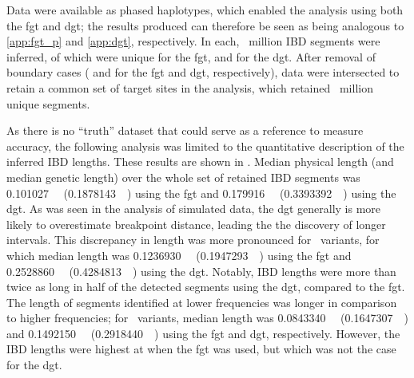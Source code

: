 %

%

Data were available as phased haplotypes, which enabled the analysis using both the \gls{fgt} and \gls{dgt}; \ie the results produced can therefore be seen as being analogous to \cref{app:fgt_p} and \cref{app:dgt}, respectively.
In each, ~million IBD segments were inferred, of which  were unique for the \gls{fgt}, and  for the \gls{dgt}.
After removal of boundary cases ( and  for the \gls{fgt} and \gls{dgt}, respectively), data were intersected to retain a common set of target sites in the analysis, which retained ~million unique segments.

%

%

As there is no ``truth'' dataset that could serve as a reference to measure accuracy, the following analysis was limited to the quantitative description of the inferred IBD lengths.
These results are shown in .
Median physical length (and median genetic length) over the whole set of retained IBD segments was
\SI{0.101027}{\mega\basepair} (\SI{0.1878143}{\centi\morgan}) using the \gls{fgt} and
\SI{0.179916}{\mega\basepair} (\SI{0.3393392}{\centi\morgan}) using the \gls{dgt}.
As was seen in the analysis of simulated data, the \gls{dgt} generally is more likely to overestimate breakpoint distance, leading the the discovery of longer intervals.
This discrepancy in length was more pronounced for ~variants, for which median length was
\SI{0.1236930}{\mega\basepair} (\SI{0.1947293}{\centi\morgan}) using the \gls{fgt} and
\SI{0.2528860}{\mega\basepair} (\SI{0.4284813}{\centi\morgan}) using the \gls{dgt}.
Notably, IBD lengths were more than twice as long in half of the detected segments using the \gls{dgt}, compared to the \gls{fgt}.
The length of segments identified at lower frequencies was longer in comparison to higher frequencies; \eg for ~variants, median length was
\SI{0.0843340}{\mega\basepair} (\SI{0.1647307}{\centi\morgan}) and
\SI{0.1492150}{\mega\basepair} (\SI{0.2918440}{\centi\morgan}) using the \gls{fgt} and \gls{dgt}, respectively.
However, the IBD lengths were highest at \fk{[3,5]} when the \gls{fgt} was used, but which was not the case for the \gls{dgt}.





